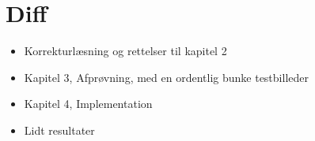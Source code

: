 {
\section*{Diff}
\begin{itemize}
    \item Korrekturlæsning og rettelser til kapitel 2
    \item Kapitel 3, Afprøvning, med en ordentlig bunke testbilleder
    \item Kapitel 4, Implementation
    \item Lidt resultater
\end{itemize}
}

